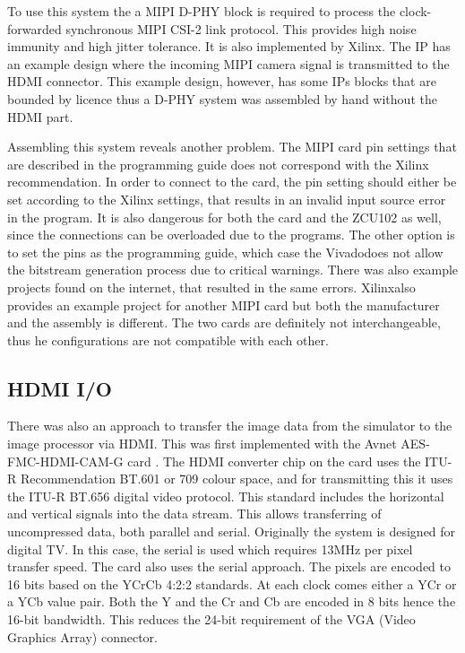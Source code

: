 To use this system the a MIPI D-PHY block is required to process the clock-forwarded synchronous MIPI CSI-2 link protocol.
This provides high noise immunity and high jitter tolerance.
It is also implemented by Xilinx.
The IP has an example design where the incoming MIPI camera signal is transmitted to the HDMI connector.
This example design, however, has some IPs blocks that are bounded by licence thus a D-PHY system was assembled by hand without the HDMI part.

Assembling this system reveals another problem.
The MIPI card pin settings that are described in the programming guide does not correspond with the Xilinx recommendation.
In order to connect to the card, the pin setting should either be set according to the Xilinx settings, that results in an invalid input source error in the program.
It is also dangerous for both the card and the ZCU102 as well, since the connections can be overloaded due to the programs.
The other option is to set the pins as the programming guide, which case the Vivado\texttrademark does not allow the bitstream generation process due to critical warnings.
There was also example projects found on the internet, that resulted in the same errors.
Xilinx\texttrademark also provides an example project for another MIPI card but both the manufacturer and the assembly is different.
The two cards are definitely not interchangeable, thus he configurations are not compatible with each other.

\subsection{HDMI I/O} %
There was also an approach to transfer the image data from the simulator to the image processor via HDMI.
This was first implemented with the Avnet AES-FMC-HDMI-CAM-G card \cite{avnet_HDMI}.
The HDMI converter chip on the card uses the ITU-R Recommendation BT.601 or 709 colour space, and for transmitting this it uses the ITU-R BT.656 digital video protocol.
This standard includes the horizontal and vertical signals into the data stream.
This allows transferring of uncompressed data, both parallel and serial.
Originally the system is designed for digital TV.
In this case, the serial is used which requires 13MHz per pixel transfer speed.
The card also uses the serial approach.
The pixels are encoded to 16 bits based on the YCrCb 4:2:2 standards.
At each clock comes either a YCr or a YCb value pair.
Both the Y and the Cr and Cb are encoded in 8 bits hence the 16-bit bandwidth.
This reduces the 24-bit requirement of the VGA (Video Graphics Array) connector.


